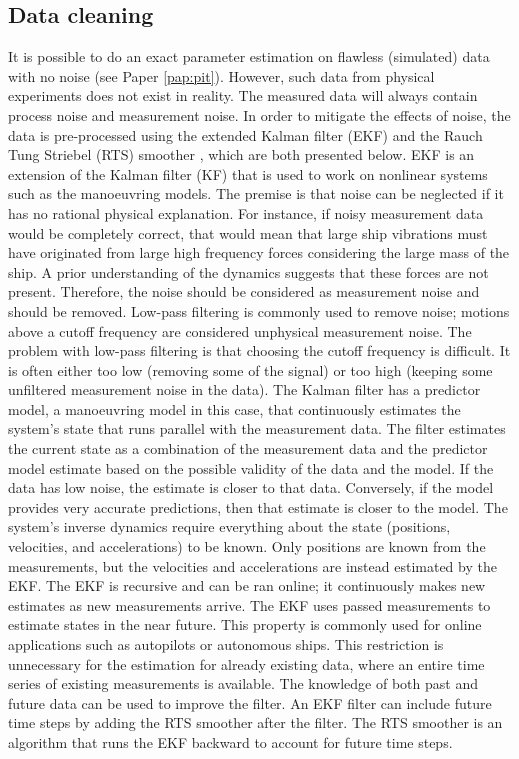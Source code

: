 \subsection{Data cleaning}
\label{sec:datacleaning}
It is possible to do an exact parameter estimation on flawless (simulated) data with no noise (see Paper \ref{pap:pit}). However, such data from physical experiments does not exist in reality. The measured data will always contain process noise and measurement noise. In order to mitigate the effects of noise, the data is pre-processed using the extended Kalman filter (EKF) \cite{brown_introduction_1997} and the Rauch Tung Striebel (RTS) smoother \cite{rauch_maximum_1965}, which are both presented below.
EKF is an extension of the Kalman filter (KF) that is used to work on nonlinear systems such as the manoeuvring models. The premise is that noise can be neglected if it has no rational physical explanation. For instance, if noisy measurement data would be  completely correct, that would mean that large ship vibrations must have originated from large high frequency forces considering the large mass of the ship. A prior understanding of the dynamics suggests that these forces are not present. Therefore, the noise should be considered as measurement noise and should be removed. Low-pass filtering is commonly used to remove noise; motions above a cutoff frequency are considered unphysical measurement noise. The problem with low-pass filtering is that choosing the cutoff frequency is difficult. It is often  either too low (removing some of the signal) or too high (keeping some unfiltered measurement noise in the data). The Kalman filter has a predictor model, a manoeuvring model in this case, that continuously estimates the system’s state that runs parallel with the measurement data. The filter estimates the current state as a combination of the measurement data and the predictor model estimate based on the possible validity of the data and the model. If the data has low noise, the estimate is closer to that data. Conversely, if the model provides very accurate predictions, then that estimate is closer to the model.
The system’s inverse dynamics require everything about the state (positions, velocities, and accelerations) to be known. Only positions are known from the measurements, but the velocities and accelerations are instead estimated by the EKF.
The EKF is recursive and can be ran online; it continuously makes new estimates as new measurements arrive. The EKF uses passed measurements to estimate states in the near future. This property is commonly used for online applications such as autopilots or autonomous ships. This restriction is unnecessary for the estimation for already existing data, where an entire time series of existing measurements is available. The knowledge of both past and future data can be used to improve the filter. An EKF filter can include future time steps by adding the RTS smoother after the filter. The RTS smoother is an algorithm that runs the EKF backward to account for future time steps.

